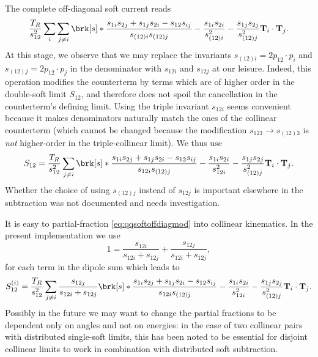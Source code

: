 \documentclass[11pt,a4paper]{article}
\newcommand{\colorT}[1]{\mathbf{T}_{#1}}
\begin{document}
The complete off-diagonal soft current reads
\begin{equation}
\label{eq:qqsoftoffdiag}
	\frac{T_R}{s_{12}^2} \sum_i \sum_{j \ne i}
	\brk[s]*{
		\frac{s_{1i}s_{2j} + s_{1j}s_{2i} - s_{12}s_{ij}}{s_{(12)i} s_{(12)j}}
		- \frac{s_{1i}s_{2i}}{s_{(12)i}^2} - \frac{s_{1j}s_{2j}}{s_{(12)j}^2}
	} \colorT{i}\cdot\colorT{j}.
\end{equation}
At this stage, we observe that we may replace
the invariants $s_{(12)i} = 2p_{12}\cdot p_i$ and $s_{(12)j} = 2p_{12}\cdot p_j$
in the denominator with $s_{12i}$ and $s_{12j}$ at our leisure.
Indeed, this operation modifies the counterterm by terms which are of higher order
in the double-soft limit $S_{12}$, and therefore does not spoil the cancellation
in the counterterm's defining limit.
Using the triple invariant $s_{12i}$ seems convenient
because it makes denominators naturally match the ones of the collinear counterterm
(which cannot be changed because the modification $s_{123}\to s_{(12)3}$
is \emph{not} higher-order in the triple-collinear limit).
We thus use
\begin{equation}
\label{eq:qqsoftoffdiagmod}
	S_{12} = \frac{T_R}{s_{12}^2} \sum_{j \ne i}
	\brk[s]*{
		\frac{s_{1i}s_{2j} + s_{1j}s_{2i} - s_{12}s_{ij}}{s_{12i} s_{(12)j}}
		- \frac{s_{1i}s_{2i}}{s_{12i}^2} - \frac{s_{1j}s_{2j}}{s_{(12)j}^2}
	} \colorT{i}\cdot\colorT{j}.
\end{equation}
Whether the choice of using $s_{(12)j}$ instead of $s_{12j}$
is important elsewhere in the subtraction was not documented
and needs investigation.

It is easy to partial-fraction \cref{eq:qqsoftoffdiagmod}
into collinear kinematics.
In the present implementation we use
\begin{equation}
	1 = \frac{s_{12i}}{s_{12i} + s_{12j}} + \frac{s_{12j}}{s_{12i} + s_{12j}},
\end{equation}
for each term in the dipole sum which leads to
\begin{equation}
\label{eq:qqsoftoffdiagmodpf}
	S_{12}^{(i)} = \frac{T_R}{s_{12}^2} \sum_{j \ne i}
	\frac{s_{12j}}{s_{12i} + s_{12j}}
	\brk[s]*{
		\frac{s_{1i}s_{2j} + s_{1j}s_{2i} - s_{12}s_{ij}}{s_{12i} s_{(12)j}}
		- \frac{s_{1i}s_{2i}}{s_{12i}^2} - \frac{s_{1j}s_{2j}}{s_{(12)j}^2}
	} \colorT{i}\cdot\colorT{j}.
\end{equation}
Possibly in the future we may want to change the partial fractions
to be dependent only on angles and not on energies:
in the case of two collinear pairs with distributed single-soft limits,
this has been noted to be essential for disjoint collinear limits to work
in combination with distributed soft subtraction.
\end{document}
